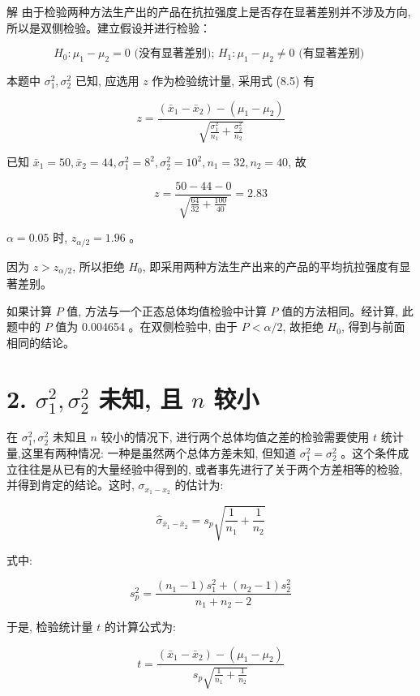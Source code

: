 \documentclass[10pt]{article}
\begin{document}
\begin{CJK*}{UTF8}{bsmi}
解 由于检验两种方法生产出的产品在抗拉强度上是否存在显著差别并不涉及方向,所以是双侧检验。建立假设并进行检验：

$$
H_{0}: \mu_{1}-\mu_{2}=0 \text { (没有显著差别); } H_{1}: \mu_{1}-\mu_{2} \neq 0 \text { (有显著差别) }
$$

本题中 $\sigma_{1}^{2}, \sigma_{2}^{2}$ 已知, 应选用 $z$ 作为检验统计量, 采用式 (8.5) 有

$$
z=\frac{\left(\bar{x}_{1}-\bar{x}_{2}\right)-\left(\mu_{1}-\mu_{2}\right)}{\sqrt{\frac{\sigma_{1}^{2}}{n_{1}}+\frac{\sigma_{2}^{2}}{n_{2}}}}
$$

已知 $\bar{x}_{1}=50, \bar{x}_{2}=44, \sigma_{1}^{2}=8^{2}, \sigma_{2}^{2}=10^{2}, n_{1}=32, n_{2}=40$, 故

$$
z=\frac{50-44-0}{\sqrt{\frac{64}{32}+\frac{100}{40}}}=2.83
$$

$\alpha=0.05$ 时, $z_{\alpha / 2}=1.96$ 。

因为 $z>z_{\alpha / 2}$, 所以拒绝 $H_{0}$, 即采用两种方法生产出来的产品的平均抗拉强度有显著差别。

如果计算 $P$ 值, 方法与一个正态总体均值检验中计算 $P$ 值的方法相同。经计算, 此题中的 $P$ 值为 0.004654 。在双侧检验中, 由于 $P<\alpha / 2$, 故拒绝 $H_{0}$, 得到与前面相同的结论。

\section*{2. $\sigma_{1}^{2}, \sigma_{2}^{2}$ 未知, 且 $n$ 较小}
在 $\sigma_{1}^{2}, \sigma_{2}^{2}$ 未知且 $n$ 较小的情况下, 进行两个总体均值之差的检验需要使用 $t$ 统计量,这里有两种情况: 一种是虽然两个总体方差未知, 但知道 $\sigma_{1}^{2}=\sigma_{2}^{2}$ 。这个条件成立往往是从已有的大量经验中得到的, 或者事先进行了关于两个方差相等的检验, 并得到肯定的结论。这时, $\sigma_{x_{1}-x_{2}}$ 的估计为:


\begin{equation*}
\hat{\sigma}_{\bar{x}_{1}-\bar{x}_{2}}=s_{p} \sqrt{\frac{1}{n_{1}}+\frac{1}{n_{2}}} \tag{8.6}
\end{equation*}


式中:


\begin{equation*}
s_{p}^{2}=\frac{\left(n_{1}-1\right) s_{1}^{2}+\left(n_{2}-1\right) s_{2}^{2}}{n_{1}+n_{2}-2} \tag{8.7}
\end{equation*}


于是, 检验统计量 $t$ 的计算公式为:


\begin{equation*}
t=\frac{\left(\bar{x}_{1}-\bar{x}_{2}\right)-\left(\mu_{1}-\mu_{2}\right)}{s_{p} \sqrt{\frac{1}{n_{1}}+\frac{1}{n_{2}}}} \tag{8.8}
\end{equation*}



\end{CJK*}
\end{document}
